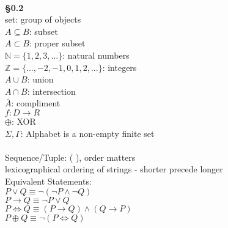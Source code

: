 \documentclass[12pt]{article}
\title{}
\author{}
\date{} %
\begin{document}
\maketitle
\ \\

\textbf{\S 0.2}\\
set: group of objects\\
$A \subseteq B$: subset\\
$A \subset B$: proper subset\\
$\mathbb{N} = \{ 1,2,3, ... \}$: natural numbers\\
$\mathbb{Z} = \{ ..., -2, -1, 0, 1, 2, ... \}$: integers\\
$A \cup B$: union\\
$A \cap B$: intersection\\
$\bar{A}$: compliment\\
$f: D \rightarrow R$\\
$\oplus$: XOR\\
$\Sigma , \Gamma$: Alphabet is a non-empty finite set\\
\ \\
Sequence/Tuple: ( ), order matters\\

lexicographical ordering of strings - shorter precede longer\\

Equivalent Statements:\\
$P \lor Q \equiv \lnot(\lnot P \land \lnot Q)$\\
$P \rightarrow Q \equiv \lnot P \lor Q$\\
$P \Leftrightarrow Q \equiv (P \rightarrow Q) \land (Q \rightarrow P)$\\
$P \oplus Q \equiv \lnot(P \Leftrightarrow  Q)$
\end{document}
